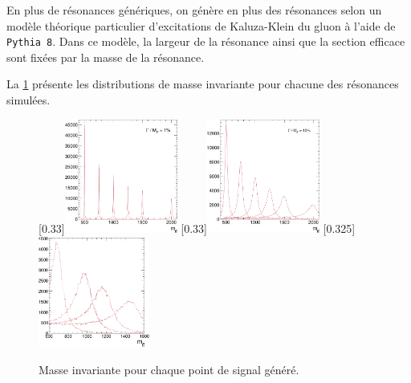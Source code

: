 \smallskip

En plus de résonances \zprime génériques, on génère en plus des résonances selon un modèle théorique particulier d'excitations de Kaluza-Klein du gluon à l'aide de \texttt{Pythia 8}. Dans ce modèle, la largeur de la résonance ainsi que la section efficace sont fixées par la masse de la résonance.

\medskip

La \cref{fig:mtt_gen} présente les distributions de masse invariante \ttbar pour chacune des résonances simulées.

\begin{figure}[tbp] \centering
    [0.33\textwidth]{\includegraphics[width=0.33\textwidth]{chapitre7/figs/mtt_zprime_narrow_gen.pdf}} \hfill
    [0.33\textwidth]{\includegraphics[width=0.33\textwidth]{chapitre7/figs/mtt_zprime_large_gen.pdf}} \hfill
    \subcaptionbox{\kkglu}[0.325\textwidth]{\includegraphics[width=0.325\textwidth]{chapitre7/figs/mtt_rsgluons_gen.pdf}}
    \caption{Masse invariante \ttbar pour chaque point de signal généré.}
    \label{fig:mtt_gen}
\end{figure}

